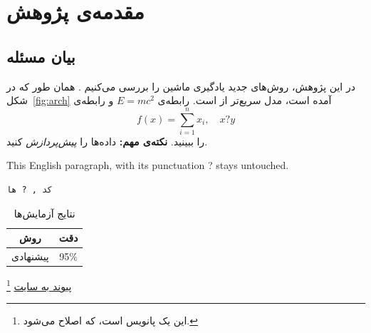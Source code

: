 \documentclass[12pt]{report}
\begin{document}
\chapter{مقدمه‌ی پژوهش}
\section{بیان مسئله}
در این پژوهش، روش‌های جدید یادگیری ماشین را بررسی می‌کنیم \cite{goodfellow2016}.
همان طور که در شکل~\ref{fig:arch} آمده است، مدل  سریع‌تر از  است.
رابطه‌ی $E = mc^2$ و رابطه‌ی
\begin{equation}
  f(x) = \sum_{i=1}^{n} x_i , \quad x ? y
\end{equation}
را ببینید. \textbf{نکته‌ی مهم:} داده‌ها را \emph{پیش‌پردازش} کنید.
\begin{latin}
This English paragraph, with its punctuation ? stays untouched.
\end{latin}
\begin{verbatim}
كد , ? ها
\end{verbatim}
\begin{table}[h]
\centering
\caption{نتایج آزمایش‌ها}
\begin{tabular}{|c|c|}
\hline
روش & دقت \\
\hline
پیشنهادی & 95\% \\
\hline
\end{tabular}
\label{tab:results}
\end{table}
\footnote{این یک پانویس است، که اصلاح می‌شود.}
\href{https://example.com/كتاب}{پیوند به سایت}
\end{document}
